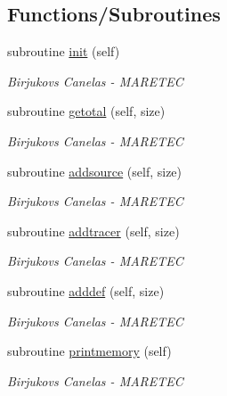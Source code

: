 \subsection*{Functions/\+Subroutines}
\begin{DoxyCompactItemize}
\item 
subroutine \mbox{\hyperlink{namespacesimulation__memory_a638f6d140103702b9e9cc46e2c060c61}{init}} (self)
\begin{DoxyCompactList}\small\item\em Birjukovs Canelas -\/ M\+A\+R\+E\+T\+EC \end{DoxyCompactList}\item 
subroutine \mbox{\hyperlink{namespacesimulation__memory_a8589522c4e28cf60741a5439477cdb31}{getotal}} (self, size)
\begin{DoxyCompactList}\small\item\em Birjukovs Canelas -\/ M\+A\+R\+E\+T\+EC \end{DoxyCompactList}\item 
subroutine \mbox{\hyperlink{namespacesimulation__memory_acf01ce7bcb2d7571d37fb2c0338e5bd2}{addsource}} (self, size)
\begin{DoxyCompactList}\small\item\em Birjukovs Canelas -\/ M\+A\+R\+E\+T\+EC \end{DoxyCompactList}\item 
subroutine \mbox{\hyperlink{namespacesimulation__memory_a4d6c8bd027a99cb6c7f9ad2eb55c744f}{addtracer}} (self, size)
\begin{DoxyCompactList}\small\item\em Birjukovs Canelas -\/ M\+A\+R\+E\+T\+EC \end{DoxyCompactList}\item 
subroutine \mbox{\hyperlink{namespacesimulation__memory_a62d5641dbec45bc279575c173b0f0f24}{adddef}} (self, size)
\begin{DoxyCompactList}\small\item\em Birjukovs Canelas -\/ M\+A\+R\+E\+T\+EC \end{DoxyCompactList}\item 
subroutine \mbox{\hyperlink{namespacesimulation__memory_a5827bef8479b809a453af147ceaa8c7c}{printmemory}} (self)
\begin{DoxyCompactList}\small\item\em Birjukovs Canelas -\/ M\+A\+R\+E\+T\+EC \end{DoxyCompactList}\end{DoxyCompactItemize}
